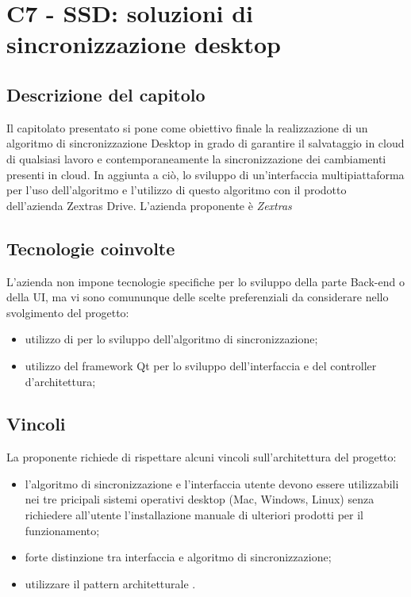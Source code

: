 \section{C7 - SSD: soluzioni di sincronizzazione desktop}

\subsection{Descrizione del capitolo}
Il capitolato presentato si pone come obiettivo finale la realizzazione di un algoritmo di sincronizzazione Desktop in grado di garantire il salvataggio in cloud di qualsiasi lavoro e contemporaneamente la sincronizzazione dei cambiamenti presenti in cloud. In aggiunta a ciò, lo sviluppo di un'interfaccia multipiattaforma per l'uso dell'algoritmo e l'utilizzo di questo algoritmo con il prodotto dell'azienda Zextras Drive.
L'azienda proponente è \textit{Zextras}

\subsection{Tecnologie coinvolte}
L'azienda non impone tecnologie specifiche per lo sviluppo della parte Back-end o della UI, ma vi sono comununque delle scelte preferenziali da considerare nello svolgimento del progetto:
\begin{itemize}
\item utilizzo di  per lo sviluppo dell'algoritmo di sincronizzazione;
\item utilizzo del framework Qt per lo sviluppo dell'interfaccia e del controller d'architettura;
\end{itemize}

\subsection{Vincoli}
La proponente richiede di rispettare alcuni vincoli sull'architettura del progetto: 
\begin{itemize}
\item l’algoritmo di sincronizzazione e l’interfaccia utente devono essere utilizzabili nei tre pricipali sistemi operativi desktop (Mac, Windows, Linux) senza richiedere all’utente l’installazione manuale di ulteriori prodotti per il funzionamento; 
\item forte distinzione tra interfaccia e algoritmo di sincronizzazione; 
\item utilizzare il pattern architetturale .
\end{itemize}

